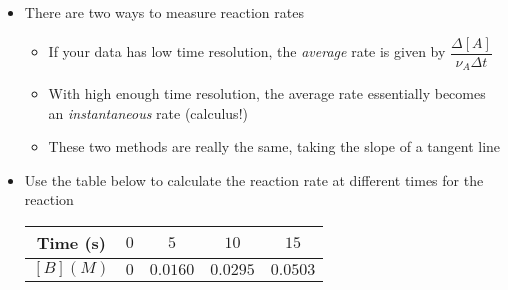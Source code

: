 \documentclass[12pt, openany, letterpaper]{memoir}
\begin{document}
\begin{itemize}
\begin{itemize}
		\item Beer's law relates how much light is absorbed: $A=\alpha lc$
	\end{itemize}
	\item There are two ways to measure reaction rates
	\begin{itemize}
		\item If your data has low time resolution, the \emph{average} rate is given by $\dfrac{\Delta\left[A\right]}{\nu_A\Delta t}$
		\item With high enough time resolution, the average rate essentially becomes an \emph{instantaneous} rate (calculus!)
		\item These two methods are really the same, taking the slope of a tangent line
	\end{itemize}
	\item Use the table below to calculate the reaction rate at different times for the reaction 
	
	\begin{tabular}{c|c|c|c|c}
		{\bfseries Time (s)}&$0$&$5$&$10$&$15$ \\ \midrule
		{\bfseries $\left[B\right](M)$}&$0$&$0.0160$&$0.0295$&$0.0503$
	\end{tabular}
\end{itemize}
\end{document}
